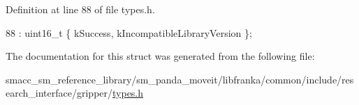 Definition at line 88 of file types.\+h.


\begin{DoxyCode}
88 : uint16\_t \{ kSuccess, kIncompatibleLibraryVersion \};
\end{DoxyCode}


The documentation for this struct was generated from the following file\+:\begin{DoxyCompactItemize}
\item 
smacc\+\_\+sm\+\_\+reference\+\_\+library/sm\+\_\+panda\+\_\+moveit/libfranka/common/include/research\+\_\+interface/gripper/\hyperlink{types_8h}{types.\+h}\end{DoxyCompactItemize}
